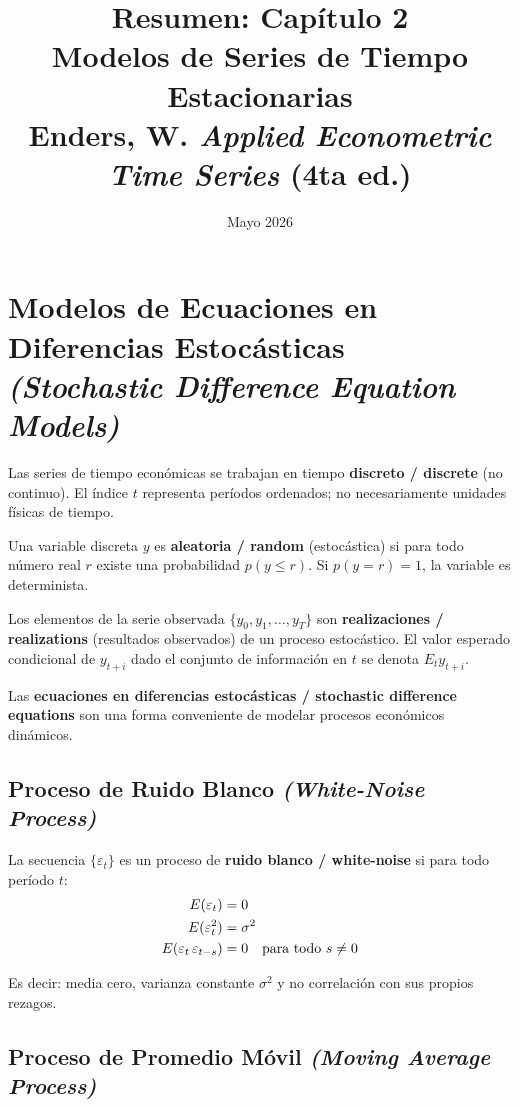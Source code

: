 \documentclass[12pt]{article}
\title{\textbf{Resumen: Cap\'itulo 2}\\
\large Modelos de Series de Tiempo Estacionarias\\
\normalsize Enders, W. \textit{Applied Econometric Time Series} (4ta ed.)}
\author{}
\date{Mayo 2026}
\begin{document}
\maketitle
\tableofcontents
\newpage

\section{Modelos de Ecuaciones en Diferencias Estoc\'asticas\\
\textit{(Stochastic Difference Equation Models)}}

Las series de tiempo econ\'omicas se trabajan en tiempo \textbf{discreto / discrete} (no continuo). El \'indice $t$ representa per\'iodos ordenados; no necesariamente unidades f\'isicas de tiempo.

Una variable discreta $y$ es \textbf{aleatoria / random} (estoc\'astica) si para todo n\'umero real $r$ existe una probabilidad $p(y \le r)$. Si $p(y = r) = 1$, la variable es determinista.

Los elementos de la serie observada $\{y_0, y_1, \ldots, y_T\}$ son \textbf{realizaciones / realizations} (resultados observados) de un proceso estoc\'astico. El valor esperado condicional de $y_{t+i}$ dado el conjunto de informaci\'on en $t$ se denota $E_t y_{t+i}$.

Las \textbf{ecuaciones en diferencias estoc\'asticas / stochastic difference equations} son una forma conveniente de modelar procesos econ\'omicos din\'amicos.

\subsection{Proceso de Ruido Blanco \textit{(White-Noise Process)}}

La secuencia $\{\varepsilon_t\}$ es un proceso de \textbf{ruido blanco / white-noise} si para todo per\'iodo $t$:
\begin{align}
E(\varepsilon_t) &= 0 \notag\\
E(\varepsilon_t^2) &= \sigma^2 \notag\\
E(\varepsilon_t\,\varepsilon_{t-s}) &= 0 \quad \text{para todo } s \ne 0
\end{align}

Es decir: media cero, varianza constante $\sigma^2$ y no correlaci\'on con sus propios rezagos.

\subsection{Proceso de Promedio M\'ovil \textit{(Moving Average Process)}}
\end{document}
